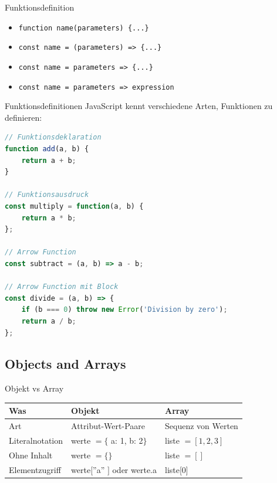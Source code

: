 \begin{KR}{Funktionsdefinition}
    \begin{itemize}
        \item \texttt{function name(parameters) \{...\}}
        \item \texttt{const name = (parameters) => \{...\}}
        \item \texttt{const name = parameters => \{...\}}
        \item \texttt{const name = parameters => expression}
    \end{itemize}
\end{KR}



\begin{example2}{Funktionsdefinitionen}
JavaScript kennt verschiedene Arten, Funktionen zu definieren:
\begin{lstlisting}[language=JavaScript, style=basesmol]
// Funktionsdeklaration
function add(a, b) {
    return a + b;
}

// Funktionsausdruck
const multiply = function(a, b) {
    return a * b;
};

// Arrow Function
const subtract = (a, b) => a - b;

// Arrow Function mit Block
const divide = (a, b) => {
    if (b === 0) throw new Error('Division by zero');
    return a / b;
};
\end{lstlisting}
\end{example2}

\subsection{Objects and Arrays}

\begin{theorem}{Objekt vs Array}

    \begin{tabular}{|l|l|l|}
        \hline
        Was & Objekt & Array \\
        \hline
        Art & Attribut-Wert-Paare & Sequenz von Werten \\
        \hline
        Literalnotation & werte $=\{$ a: 1, b: 2$\}$ & liste $=[1,2,3]$ \\
        \hline
        Ohne Inhalt & werte $=\{ \}$ & liste $=[]$ \\
        \hline
        Elementzugriff & werte[''a'' $]$ oder werte.a & liste[0] \\
        \hline
        \end{tabular}
\end{theorem}

